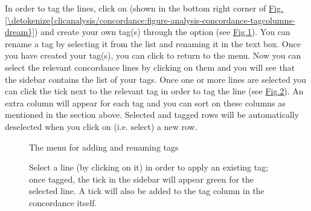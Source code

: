 \documentclass[letterpaper,10pt,english]{sphinxmanual}
\begin{document}
\sphinxAtStartPar
In order to tag the lines, click on  (shown in
the bottom right corner of \hyperref[\detokenize{clicanalysis/concordance:figure-analysis-concordance-tagcolumns-dream}]{Fig.\@ \ref{\detokenize{clicanalysis/concordance:figure-analysis-concordance-tagcolumns-dream}}}) and create
your own tag(s) through the  option (see
\hyperref[\detokenize{clicanalysis/concordance:figure-analysis-concordance-tagcolumns-menu}]{Fig.\@ \ref{\detokenize{clicanalysis/concordance:figure-analysis-concordance-tagcolumns-menu}}}). You can
rename a tag by selecting it from the  list and
renaming it in the text box. Once you have created your tag(s), you can
click  to return to the menu. Now you can select the relevant
concordance lines by clicking on them and you will see that the sidebar
contains the list of your tags. Once one or more lines are selected you
can click the tick next to the relevant tag in order to tag the line
(see \hyperref[\detokenize{clicanalysis/concordance:figure-analysis-concordance-tagcolumns-selectline}]{Fig.\@ \ref{\detokenize{clicanalysis/concordance:figure-analysis-concordance-tagcolumns-selectline}}}).
An extra column will appear for each tag and you can sort on these
columns as mentioned in the {\hyperref[\detokenize{clicanalysis/concordance:basic-sorting}]{}} section above. Selected and tagged
rows will be automatically deselected when you click on (i.e. select) a
new row.

\begin{figure}[htbp]
\centering
\capstart

\noindent{}
\caption{The menu for adding and renaming tags}\label{\detokenize{clicanalysis/concordance:id22}}\label{\detokenize{clicanalysis/concordance:figure-analysis-concordance-tagcolumns-menu}}\end{figure}

\begin{figure}[htbp]
\centering
\capstart

\noindent{}
\caption{Select a line (by clicking on it) in order to apply an
existing tag; once tagged, the tick in the sidebar will appear green
for the selected line.
A tick will also be added to the tag column in
the concordance itself.}\label{\detokenize{clicanalysis/concordance:id23}}\label{\detokenize{clicanalysis/concordance:figure-analysis-concordance-tagcolumns-selectline}}\end{figure}
\end{document}
